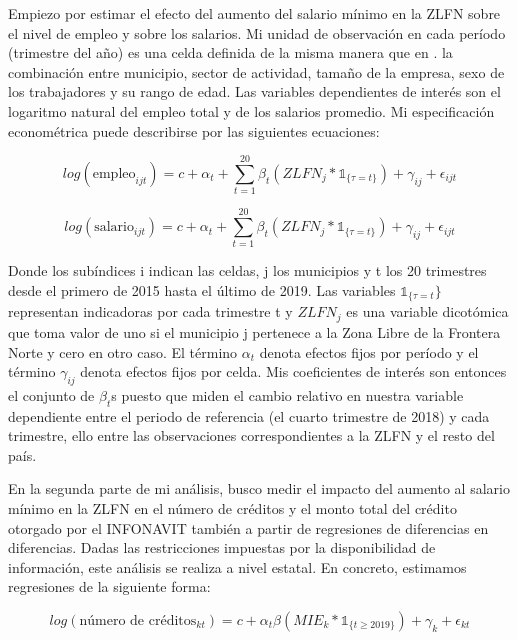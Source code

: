 \noindent Empiezo por estimar el efecto del aumento del salario mínimo en la ZLFN sobre el nivel de empleo y sobre los salarios. Mi unidad de observación en cada período (trimestre del año) es una celda definida de la misma manera que en \citep{kumler_verhoogen_frias_2020}. la combinación entre municipio, sector de actividad, tamaño de la empresa, sexo de los trabajadores  y su rango de edad. Las variables dependientes de interés son el logaritmo natural del empleo total y de los salarios promedio. Mi especificación econométrica puede describirse por las siguientes ecuaciones:

\begin{equation}\label{eq:1}
log(\textrm{empleo}_{ijt})=c+\alpha_t+\sum_{t=1}^{20} \beta_t(ZLFN_j * \mathds{1}_{\{\tau=t\}})+\gamma_{ij}+\epsilon_{ijt}
\end{equation}

\begin{equation}\label{eq:2}
log(\textrm{salario}_{ijt})=c+\alpha_t+\sum_{t=1}^{20} \beta_t(ZLFN_j * \mathds{1}_{\{\tau=t\}})+\gamma_{ij}+\epsilon_{ijt}
\end{equation}

Donde los subíndices i indican las celdas, j los municipios y t los 20 trimestres desde el primero de 2015 hasta el último de 2019. Las variables $\mathds{1}_{\{\tau=t}\}$ representan indicadoras por cada trimestre t y $ZLFN_j$ es una variable dicotómica que toma valor de uno si el municipio j pertenece a la Zona Libre de la Frontera Norte y cero en otro caso. El término $\alpha_t$ denota efectos fijos por período y el término $\gamma_{ij}$ denota efectos fijos por celda. Mis coeficientes de interés son entonces el conjunto de $\beta_t$s puesto que miden el cambio relativo en nuestra variable dependiente entre el periodo de referencia (el cuarto trimestre de 2018) y cada trimestre, ello entre las observaciones correspondientes a la ZLFN y el resto del país. 

En la segunda parte de mi análisis, busco medir el impacto del aumento al salario mínimo en la ZLFN en el número de créditos y el monto total del crédito otorgado por el INFONAVIT también a partir de regresiones de diferencias en diferencias. Dadas las restricciones impuestas por la disponibilidad de información, este análisis se realiza a nivel estatal. En concreto, estimamos regresiones de la siguiente forma:

\begin{equation}\label{eq:3}
log(\textrm{número de créditos}_{kt})=c+\alpha_t\beta(MIE_k*\mathds{1}_{\{t\geq2019\}})+\gamma_k+\epsilon_{kt}
\end{equation}

